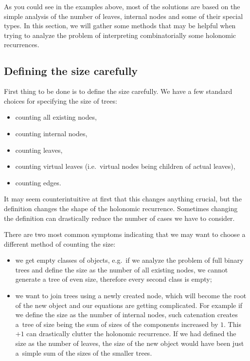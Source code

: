 \documentclass[final]{article}
\theoremstyle{definition}
\theoremstyle{definition}
\theoremstyle{remark}
\begin{document}
As you could see in the examples above, most of the solutions are based on the simple analysis of the number of leaves, internal nodes and some of their special types. In this section, we will gather some methods that may be helpful when trying to analyze the problem of interpreting combinatorially some holonomic recurrences.

\subsection{Defining the size carefully}%
\label{sub:defining_the_size_carefully}

First thing to be done is to define the size carefully. We have a few standard choices for specifying the size of trees:
\begin{itemize}
    \item counting all existing nodes,
    \item counting internal nodes,
    \item counting leaves,
    \item counting virtual leaves (i.e.~virtual nodes being children of actual leaves),
    \item counting edges.
\end{itemize}

It may seem counterintuitive at first that this changes anything crucial, but the definition changes the shape of the holonomic recurrence. Sometimes changing the definition can drastically reduce the number of cases we have to consider.

There are two most common symptoms indicating that we may want to choose a different method of counting the size:
\begin{itemize}
    \item we get empty classes of objects, e.g.~if we analyze the problem of full binary trees and define the size as the number of all existing nodes, we cannot generate a tree of even size, therefore every second class is empty;
    \item we want to join trees using a newly created node, which will become the root of the new object and our equations are getting complicated. For example if we define the size as the number of internal nodes, such catenation creates a~tree of size being the sum of sizes of the components increased by \(1\). This \(+1\) can drastically clutter the holonomic recurrence. If we had defined the size as the number of leaves, the size of the new object would have been just a~simple sum of the sizes of the smaller trees.
\end{itemize}
\end{document}
